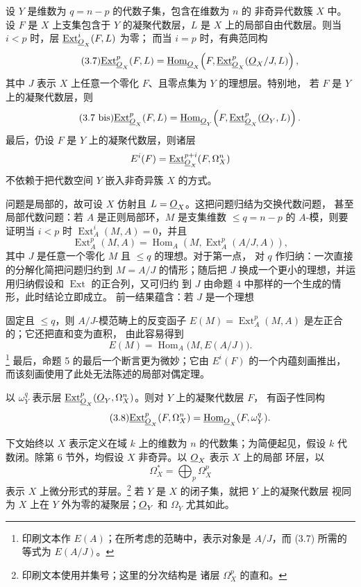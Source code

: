 设 $Y$ 是维数为 $q=n-p$ 的代数子集，包含在维数为 $n$ 的
非奇异代数簇 $X$ 中。设 $F$ 是 $X$ 上支集包含于 $Y$ 的凝聚代数层，$L$ 是
$X$ 上的局部自由代数层。则当 $i<p$ 时，层 $\underline{\operatorname{Ext}}_{\underline{O}_X}^{i}(F,L)$ 为零；
而当 $i=p$ 时，有典范同构
\begin{equation}\tag{3.7}
  \underline{\operatorname{Ext}}_{\underline{O}_X}^{p}(F,L)
  =\underline{\operatorname{Hom}}_{\underline{O}_X}\!\left(F,
  \underline{\operatorname{Ext}}_{\underline{O}_X}^{p}(\underline{O}_X/J,L)\right),
\end{equation}
其中 $J$ 表示 $X$ 上任意一个零化 $F$、且零点集为 $Y$ 的理想层。特别地，
若 $F$ 是 $Y$ 上的凝聚代数层，则
\begin{equation}\tag{3.7 bis}
  \underline{\operatorname{Ext}}_{\underline{O}_X}^{p}(F,L)
  =\underline{\operatorname{Hom}}_{\underline{O}_Y}\!\left(F,\underline{\operatorname{Ext}}_{\underline{O}_X}^{p}(\underline{O}_Y,L)\right).
\end{equation}
最后，仍设 $F$ 是 $Y$ 上的凝聚代数层，则诸层
\[
  E^{i}(F)=\underline{\operatorname{Ext}}_{\underline{O}_X}^{p+i}(F,\Omega_X^{n})
\]
不依赖于把代数空间 $Y$ 嵌入非奇异簇 $X$ 的方式。

问题是局部的，故可设 $X$ 仿射且 $L=\underline{O}_X$。这把问题归结为交换代数问题，
甚至局部代数问题：若 $A$ 是正则局部环，$M$ 是支集维数
$\leq q=n-p$ 的 $A$-模，则要证明当 $i<p$ 时
$\operatorname{Ext}_{A}^{i}(M,A)=0$，并且
\[
  \operatorname{Ext}_{A}^{p}(M,A)
  =\operatorname{Hom}_{A}\!\left(M,\operatorname{Ext}_{A}^{p}(A/J,A)\right),
\]
其中 $J$ 是任意一个零化 $M$ 且 $\leq q$ 的理想。对于第一点，
对 $q$ 作归纳：一次直接的分解化简把问题归约到 $M=A/J$ 的情形；随后把 $J$
换成一个更小的理想，并运用归纳假设和 $\operatorname{Ext}$ 的正合列，又可归约
到 $J$ 由命题 4 中那样的一个生成的情形，此时结论立即成立。
前一结果蕴含：若 $J$ 是一个理想

固定且 $\leq q$，则 $A/J$-模范畴上的反变函子
$E(M)=\operatorname{Ext}_{A}^{p}(M,A)$ 是左正合的；它还把直和变为直积，
由此容易得到
\[
  E(M)=\operatorname{Hom}_{A}\bigl(M,E(A/J)\bigr).
\]
\footnote{印刷文本作 $E(A)$；在所考虑的范畴中，表示对象是 $A/J$，而 (3.7)
所需的等式为 $E(A/J)$。} 最后，命题 5 的最后一个断言更为微妙；它由
$E^{i}(F)$ 的一个内蕴刻画推出，而该刻画使用了此处无法陈述的局部对偶定理。

 以 $\omega_Y^{q}$ 表示层
$\underline{\operatorname{Ext}}_{\underline{O}_X}^{p}(\underline{O}_Y,\Omega_X^{n})$。则对 $Y$ 上的凝聚代数层 $F$，
有函子性同构
\begin{equation}\tag{3.8}
  \underline{\operatorname{Ext}}_{\underline{O}_X}^{p}(F,\Omega_X^{n})
  =\underline{\operatorname{Hom}}_{\underline{O}_X}(F,\omega_Y^{q}).
\end{equation}


下文始终以 $X$ 表示定义在域 $k$ 上的维数为 $n$ 的代数集；为简便起见，假设
$k$ 代数闭。除第 6 节外，均假设 $X$ 非奇异。以 $\underline{O}_X$ 表示 $X$ 上的局部
环层，以
\[
  \Omega_X^{*}=\bigoplus_p\Omega_X^{p}
\]
表示 $X$ 上微分形式的芽层。\footnote{印刷文本使用并集号；这里的分次结构是
诸层 $\Omega_X^p$ 的直和。} 若 $Y$ 是 $X$ 的闭子集，就把 $Y$ 上的凝聚代数层
视同为 $X$ 上在 $Y$ 外为零的凝聚层；$\underline{O}_Y$ 和 $\Omega_Y$ 尤其如此。

